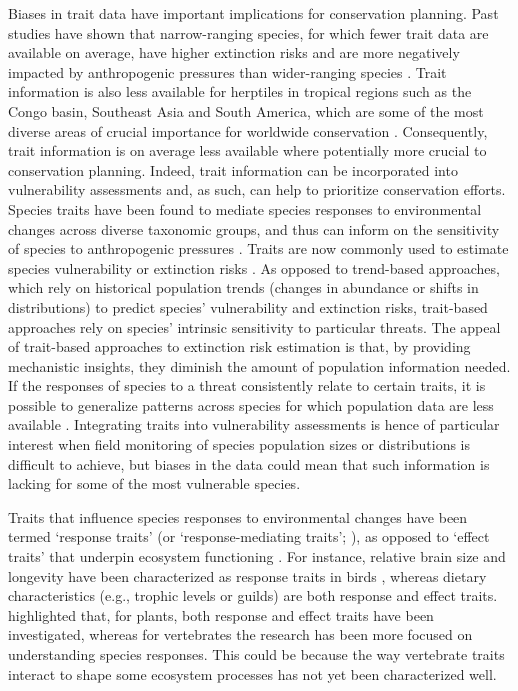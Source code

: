 Biases in trait data have important implications for conservation planning. Past studies have shown that narrow-ranging species, for which fewer trait data are available on average, have higher extinction risks \citep{Collen2016, Purvis2000, Ripple2017} and are more negatively impacted by anthropogenic pressures than wider-ranging species \citep{Newbold2018a}. Trait information is also less available for herptiles in tropical regions such as the Congo basin, Southeast Asia and South America, which are some of the most diverse areas of crucial importance for worldwide conservation \citep{Barlow2018}. Consequently, trait information is on average less available where potentially more crucial to conservation planning. Indeed, trait information can be incorporated into vulnerability assessments and, as such, can help to prioritize conservation efforts. Species traits have been found to mediate species responses to environmental changes across diverse taxonomic groups, and thus can inform on the sensitivity of species to anthropogenic pressures \citep{Flynn2009, Newbold2013, Nowakowski2017}. Traits are now commonly used to estimate species vulnerability or extinction risks \citep{Pacifici2015, RamirezBautista2020}. As opposed to trend-based approaches, which rely on historical population trends (changes in abundance or shifts in distributions) to predict species’ vulnerability and extinction risks, trait-based approaches rely on species’ intrinsic sensitivity to particular threats. The appeal of trait-based approaches to extinction risk estimation is that, by providing mechanistic insights, they diminish the amount of population information needed. If the responses of species to a threat consistently relate to certain traits, it is possible to generalize patterns across species for which population data are less available \citep{Verberk2013}. Integrating traits into vulnerability assessments is hence of particular interest when field monitoring of species population sizes or distributions is difficult to achieve, but biases in the data could mean that such information is lacking for some of the most vulnerable species.


Traits that influence species responses to environmental changes have been termed `response traits' (or `response-mediating traits'; \citet{Luck2012}), as opposed to `effect traits' that underpin ecosystem functioning \citep{Lavorel2002a}. For instance, relative brain size and longevity have been characterized as response traits in birds \citep{Newbold2013, Sayol2020}, whereas dietary characteristics (e.g., trophic levels or guilds) are both response and effect traits. \citet{Hortal2015} highlighted that, for plants, both response and effect traits have been investigated, whereas for vertebrates the research has been more focused on understanding species responses. This could be because the way vertebrate traits interact to shape some ecosystem processes has not yet been characterized well.

